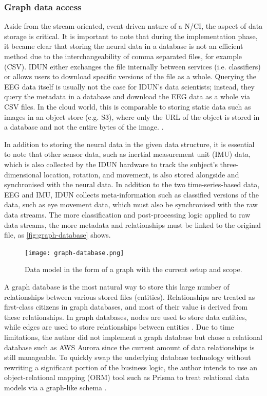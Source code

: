 \subsubsection{Graph data access}
\label{chapter5-graph-data-access}

Aside from the stream-oriented, event-driven nature of a N/CI, the aspect of data storage is critical. It is important to note that during the implementation phase, it became clear that storing the neural data in a database is not an efficient method due to the interchangeability of comma separated files, for example (CSV). IDUN either exchanges the file internally between services (i.e. classifiers) or allows users to download specific versions of the file as a whole. Querying the EEG data itself is usually not the case for IDUN's data scientists; instead, they query the metadata in a database and download the EEG data as a whole via CSV files. In the cloud world, this is comparable to storing static data such as images in an object store (e.g. S3), where only the URL of the object is stored in a database and not the entire bytes of the image. \citep{datanamic_store_nodate}.

In addition to storing the neural data in the given data structure, it is essential to note that other sensor data, such as inertial measurement unit (IMU) data, which is also collected by the IDUN hardware to track the subject's three-dimensional location, rotation, and movement, is also stored alongside and synchronised with the neural data. In addition to the two time-series-based data, EEG and IMU, IDUN collects meta-information such as classified versions of the data, such as eye movement data, which must also be synchronised with the raw data streams. The more classification and post-processing logic applied to raw data streams, the more metadata and relationships must be linked to the original file, as \autoref{fig:graph-database} shows.

\begin{figure}[!ht]
  \centering
  \texttt{[image: graph-database.png]}
  \caption{Data model in the form of a graph with the current setup and scope.}
  \label{fig:graph-database}
\end{figure}

A graph database is the most natural way to store this large number of relationships between various stored files (entities). Relationships are treated as first-class citizens in graph databases, and most of their value is derived from these relationships. In graph databases, nodes are used to store data entities, while edges are used to store relationships between entities \citep{amazon_web_services_inc_what_nodate}. Due to time limitations, the author did not implement a graph database but chose a relational database such as AWS Aurora since the current amount of data relationships is still manageable. To quickly swap the underlying database technology without rewriting a significant portion of the business logic, the author intends to use an object-relational mapping (ORM) tool such as Prisma to treat relational data models via a graph-like schema \citep{prisma_data_nodate}.

